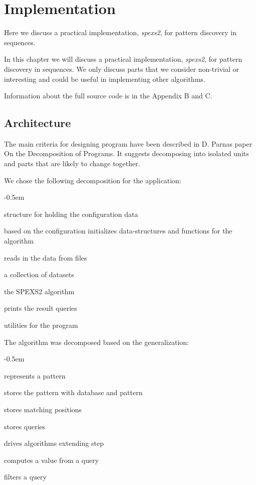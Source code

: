 \chapter{Implementation}

Here we discuss a practical implementation, \emph{spexs2}, for
pattern discovery in sequences. 

In this chapter we will discuss a practical implementation, \emph{spexs2}, for 
pattern discovery in sequences. We only discuss parts that we consider non-trivial 
or interesting and could be useful in implementing other algorithms.

Information about the full source code is in the Appendix B and C.

\section{Architecture}

The main criteria for designing program have been described in D. Parnas
paper On the Decomposition of Programs. It suggests decomposing into
isolated units and parts that are likely to change together. \cite{Parnas72}

We chose the following decomposition for the application:

\begin{small}
\begin{description}
    \itemsep-0.5em
    \item[Configuration] structure for holding the configuration data
    \item[Setup] based on the configuration initializes data-structures and functions for the algorithm
    \item[Reader] reads in the data from files
    \item[Database] a collection of datasets
    \item[Algorithm] the SPEXS2 algorithm
    \item[Printer] prints the result queries
    \item[Debugging] utilities for the program
\end{description}
\end{small}

The algorithm was decomposed based on the generalization:

\begin{small}
\begin{description}
    \itemsep-0.5em
    \item[Pattern] represents a pattern
    \item[Query] stores the pattern with database and pattern
    \item[Set] stores matching positions
    \item[Pool] stores queries
    \item[Extender] drives algorithms extending step
    \item[Feature] computes a value from a query
    \item[Filter] filters a query
\end{description}
\end{small}

